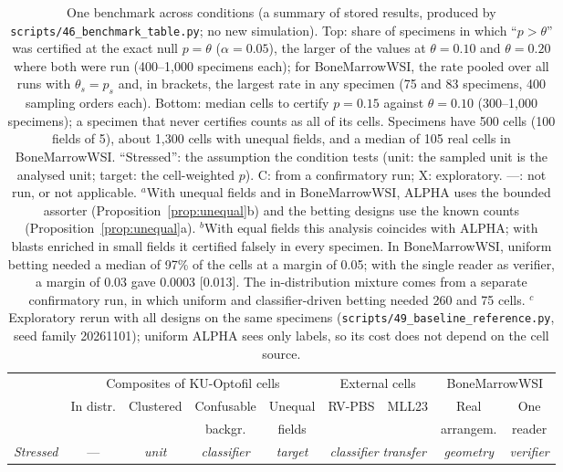 \documentclass[11pt]{article}
\theoremstyle{remark}
\theoremstyle{definition}
\begin{document}
\begin{table}[t]
\centering\footnotesize
\setlength{\tabcolsep}{2.3pt}
\caption{One benchmark across conditions (a summary of stored results, produced by \texttt{scripts/46\_benchmark\_table.py}; no new simulation). Top: share of specimens in which ``$p>\theta$'' was certified at the exact null $p=\theta$ ($\alpha=0.05$), the larger of the values at $\theta=0.10$ and $\theta=0.20$ where both were run (400--1,000 specimens each); for BoneMarrowWSI, the rate pooled over all runs with $\theta_s=p_s$ and, in brackets, the largest rate in any specimen (75 and 83 specimens, 400 sampling orders each). Bottom: median cells to certify $p=0.15$ against $\theta=0.10$ (300--1,000 specimens); a specimen that never certifies counts as all of its cells. Specimens have 500 cells (100 fields of 5), about 1,300 cells with unequal fields, and a median of 105 real cells in BoneMarrowWSI. ``Stressed'': the assumption the condition tests (unit: the sampled unit is the analysed unit; target: the cell-weighted $p$). C: from a confirmatory run; X: exploratory. ---: not run, or not applicable. $^a$With unequal fields and in BoneMarrowWSI, ALPHA uses the bounded assorter (Proposition~\ref{prop:unequal}b) and the betting designs use the known counts (Proposition~\ref{prop:unequal}a). $^b$With equal fields this analysis coincides with ALPHA; with blasts enriched in small fields it certified falsely in every specimen. In BoneMarrowWSI, uniform betting needed a median of 97\% of the cells at a margin of 0.05; with the single reader as verifier, a margin of 0.03 gave 0.0003 [0.013]. The in-distribution mixture comes from a separate confirmatory run, in which uniform and classifier-driven betting needed 260 and 75 cells. $^c$Exploratory rerun with all designs on the same specimens (\texttt{scripts/49\_baseline\_reference.py}, seed family 20261101); uniform ALPHA sees only labels, so its cost does not depend on the cell source.}\label{tab:bench}
\vspace{3pt}
\begin{tabular}{@{}l cccc cc cc@{}}
\toprule
 & \multicolumn{4}{c}{Composites of KU-Optofil cells} & \multicolumn{2}{c}{External cells} & \multicolumn{2}{c}{BoneMarrowWSI}\\
\cmidrule(lr){2-5}\cmidrule(lr){6-7}\cmidrule(l){8-9}
 & In distr. & Clustered & Confusable & Unequal & RV-PBS & MLL23 & Real & One\\
 & & & backgr. & fields & & & arrangem. & reader\\
\emph{Stressed} & --- & \emph{unit} & \emph{classifier} & \emph{target} & \multicolumn{2}{c}{\emph{classifier transfer}} & \emph{geometry} & \emph{verifier}\\

\end{tabular}
\end{table}
\end{document}
